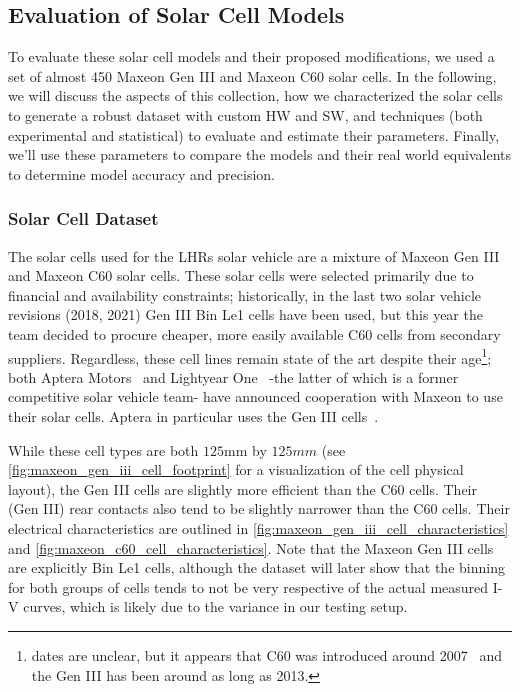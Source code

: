 \subsection{Evaluation of Solar Cell Models}\label{subsec:eval_solar_cell_models}

To evaluate these solar cell models and their proposed modifications, we used a
set of almost 450 Maxeon Gen III and Maxeon C60 solar cells. In the following,
we will discuss the aspects of this collection, how we characterized the solar
cells to generate a robust dataset with custom \acf{HW} and \acf{SW}, and
techniques (both experimental and statistical) to evaluate and estimate their
parameters. Finally, we'll use these parameters to compare the models and their
real world equivalents to determine model accuracy and precision.

\subsubsection{Solar Cell Dataset}\label{subsubsec:solar_cell_dataset}

The solar cells used for the \ac{LHRs} solar vehicle are a mixture of Maxeon Gen
III and Maxeon C60 solar cells. These solar cells were selected primarily due to
financial and availability constraints; historically, in the last two solar
vehicle revisions (2018, 2021) Gen III Bin Le1 cells have been used, but this
year the team decided to procure cheaper, more easily available C60 cells from
secondary suppliers. Regardless, these cell lines remain state of the art
despite their age\footnote{dates are unclear, but it appears that C60 was
introduced around 2007~\cite{sunpower_history} and the Gen III has been around
as long as 2013\cite{smith_et_al}.}; both Aptera
Motors~\cite{aptera_solar_cells} and Lightyear
One~\cite{lightyear_one_solar_cells} -the latter of which is a former
competitive solar vehicle team- have announced cooperation with Maxeon to use
their solar cells. Aptera in particular uses the Gen III
cells~\cite{aptera_solar_cells}.

While these cell types are both $125 \si{\mm}$ by $125 \si{mm}$ (see
\autoref{fig:maxeon_gen_iii_cell_footprint} for a visualization of the cell
physical layout), the Gen III cells are slightly more efficient than the C60
cells. Their (Gen III) rear contacts also tend to be slightly narrower than the
C60 cells. Their electrical characteristics are outlined in
\autoref{fig:maxeon_gen_iii_cell_characteristics} and
\autoref{fig:maxeon_c60_cell_characteristics}. Note that the Maxeon Gen III
cells are explicitly Bin Le1 cells, although the dataset will later show that
the binning for both groups of cells tends to not be very respective of the
actual measured \ac{I-V} curves, which is likely due to the variance in our
testing setup.


